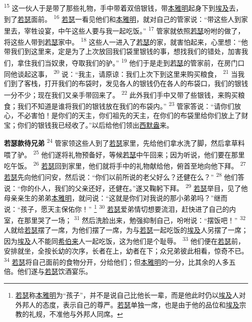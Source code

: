\textsuperscript{15}
这一伙人于是带了那些礼物，手中带着双倍银钱，带\uline{本雅明}起身下到\uline{埃及}去，到了\uline{若瑟}面前。
\textsuperscript{16}
\uline{若瑟}一看见他们和\uline{本雅明}，就对自己的管家说：“带这些人到家里去，宰牲设宴，中午这些人要与我一起吃饭。”
\textsuperscript{17}
管家就依照\uline{若瑟}吩咐的做了，将这些人带到\uline{若瑟}家中。
\textsuperscript{18}
这些人一进入了\uline{若瑟}的家，就害怕起来，心里想：“他带我们到这里来，定是为了上次放回我们袋里银钱的事，想找我们的错处，加害我们，拿住我们当奴隶，夺取我们的驴。”
\textsuperscript{19}
他们于是走到\uline{若瑟}的管家前，在房门口同他谈起这事，
\textsuperscript{20}
说：“我主，请原谅：我们上次下到这里来购买粮食，
\textsuperscript{21}
当我们到了客栈，打开我们的布袋时，发见各人的银钱仍在各人的布袋口，我们的银钱一分不少；现在我们又亲手带回来了。
\textsuperscript{22}
此外我们手中又带了些银钱，来购买粮食；我们不知道是谁将我们的银钱放在我们的布袋内。”
\textsuperscript{23}
管家答说：“请你们放心，不必害怕！是你们的天主，你们祖先的天主，在你们的布袋里给你们放上了财宝；你们的银钱我已经收了。”以后给他们领出\uline{西默盎}来。

\textbf{若瑟款待兄弟 }
\textsuperscript{24}
管家领这些人到了\uline{若瑟}家里，先给他们拿水洗了脚，然后拿草料喂了驴。
\textsuperscript{25}
他们遂将礼物预备好，等候\uline{若瑟}中午回来；因为听说，他们要在那里吃午饭。
\textsuperscript{26}
\uline{若瑟}回到家里，他们就将手中的礼物献给他，俯首至地向他下拜。
\textsuperscript{27}
\uline{若瑟}先向他们问安，然后说：“你们以前所说的老父好么？还健在么？”
\textsuperscript{28}
他们答说：“你的仆人，我们的父亲还好，还健在。”遂又鞠躬下拜。
\textsuperscript{29}
\uline{若瑟}举目，见了他母亲亲生的弟弟\uline{本雅明}，就问说：“这就是你们对我说的那小弟弟吗？”继而说：“孩子，愿天主保佑你！”
\footnote{\uline{若瑟}称\uline{本雅明}为“孩子”，并不是说自己比他长一辈，而是他此时仍以\uline{埃及}人对外邦人的态度，表示自己的尊严。\uline{若瑟}单独一席，也是由于他的品位和\uline{埃及}宗教的礼规，不准他与外邦人同席。}
\textsuperscript{30}
\uline{若瑟}爱弟情切想要流泪，赶快进了自己的内室，在那里哭了一场；
\textsuperscript{31}
然后洗脸出来，勉强抑制自己，吩咐说：“摆饭吧！”
\textsuperscript{32}
人就给\uline{若瑟}摆了一席，为他们摆了一席，为与\uline{若瑟}一起吃饭的\uline{埃及}人另摆了一席；因为\uline{埃及}人不能同\uline{希伯来}人一起吃饭，这为他们是个耻辱。
\textsuperscript{33}
他们便在\uline{若瑟}前，安排就坐，全按长幼的次序，长者在上，幼者在下；众兄弟彼此相看，惊奇不已。
\textsuperscript{34}
\uline{若瑟}将自己面前的食物分开，分给他们；但\uline{本雅明}的一分，比其余的人多五倍。他们遂与\uline{若瑟}饮酒宴乐。

